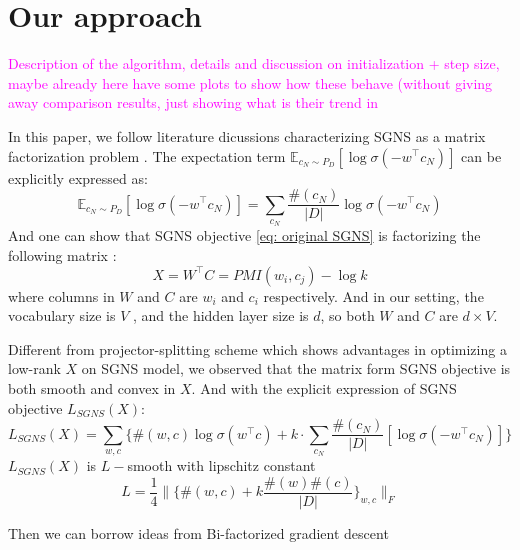 \documentclass[letterpaper]{article} %
\begin{document}
\section{Our approach}
\textcolor{magenta}{Description of the algorithm, details and discussion on initialization + step size, maybe already here have some plots to show how these behave (without giving away comparison results, just showing what is their trend in}

In this paper, we follow literature dicussions characterizing SGNS as a matrix factorization problem \cite{levy2014neural}\cite{levy2015improving}. The expectation term $\mathbb{E}_{c_N\sim P_D}[\log \sigma(-w^\top c_N)]$ can be explicitly expressed as:
\begin{equation}
	\mathbb{E}_{c_N\sim P_D}[\log \sigma(-w^\top c_N)]=\sum_{c_N}\frac{\#(c_N)}{|D|}\log{\sigma(-w^\top c_N)}
\end{equation}
And one can show that SGNS objective \ref{eq: original SGNS} is factorizing the following matrix \cite{levy2014neural}:
\begin{equation}
	X=W^\top C= PMI(w_i, c_j)-\log k \label{eq: SPPMI}
\end{equation}
where columns in $W$ and $C$ are $w_i$ and $c_i$ respectively. And in our setting, the vocabulary size is $V$ , and the hidden layer size is $d$, so both $W$ and $C$ are $d\times V$.

Different from projector-splitting scheme\cite{fonarev2017riemannian} which shows advantages in optimizing a low-rank $X$ on SGNS model, we observed that the matrix form SGNS objective is both smooth and convex in $X$. And with the explicit expression of SGNS objective $L_{SGNS}(X)$:
\begin{equation}
	L_{SGNS}(X)=\sum_{w,c}\{\#(w,c)\log\sigma(w^\top c)+k\cdot\sum_{c_N}\frac{\#(c_N)}{|D|}[\log \sigma(-w^\top c_N)]\}
\end{equation}
$L_{SGNS}(X)$ is $L-$smooth with lipschitz constant $$L=\frac{1}{4}\|\{\#(w,c)+k\frac{\#(w)\#(c)}{|D|}\}_{w,c}\|_F$$



Then we can borrow ideas from Bi-factorized gradient descent  \cite{park2016finding}
\end{document}
